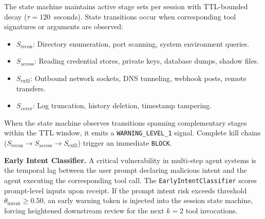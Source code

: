 \documentclass[conference]{IEEEtran}
\begin{document}
The state machine maintains active stage sets per session with TTL-bounded decay ($\tau = 120$~seconds). State transitions occur when corresponding tool signatures or arguments are observed:
\begin{itemize}[leftmargin=*]
    \item $S_{\text{recon}}$: Directory enumeration, port scanning, system environment queries.
    \item $S_{\text{access}}$: Reading credential stores, private keys, database dumps, shadow files.
    \item $S_{\text{exfil}}$: Outbound network sockets, DNS tunneling, webhook posts, remote transfers.
    \item $S_{\text{cover}}$: Log truncation, history deletion, timestamp tampering.
\end{itemize}

When the state machine observes transitions spanning complementary stages within the TTL window, it emits a \texttt{WARNING\_LEVEL\_1} signal. Complete kill chains ($S_{\text{recon}} \to S_{\text{access}} \to S_{\text{exfil}}$) trigger an immediate \texttt{BLOCK}.

\textbf{Early Intent Classifier.} A critical vulnerability in multi-step agent systems is the temporal lag between the user prompt declaring malicious intent and the agent executing the corresponding tool call. The \texttt{EarlyIntentClassifier} scores prompt-level inputs upon receipt. If the prompt intent risk exceeds threshold $\theta_{\text{intent}} \geq 0.50$, an early warning token is injected into the session state machine, forcing heightened downstream review for the next $k=2$ tool invocations.
\end{document}
